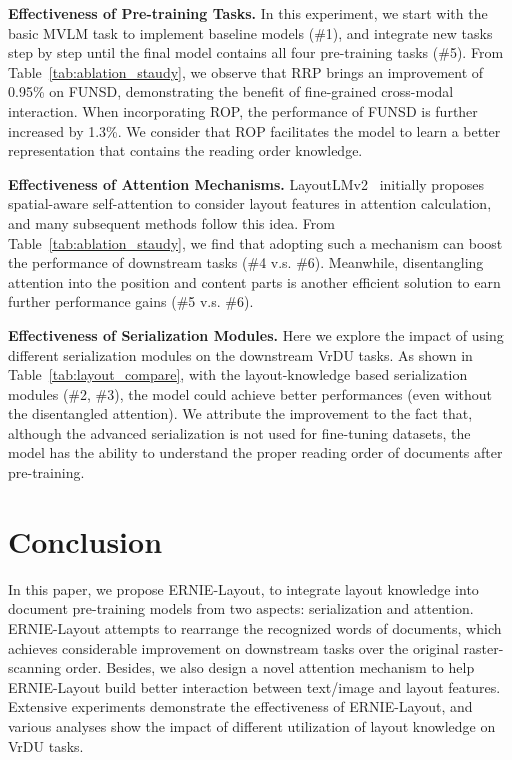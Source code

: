 \documentclass[11pt]{article}
\begin{document}
\noindent\textbf{Effectiveness of Pre-training Tasks.} 
In this experiment, we start with the basic MVLM task to implement baseline models (\#1), and integrate new tasks step by step until the final model contains all four pre-training tasks (\#5).
From Table~\ref{tab:ablation_staudy}, we observe that RRP brings an improvement of 0.95\% on FUNSD, demonstrating the benefit of fine-grained cross-modal interaction.
When incorporating ROP, the performance of FUNSD is further increased by 1.3\%. We consider that ROP facilitates the model to learn a better representation that contains the reading order knowledge. 


\noindent\textbf{Effectiveness of Attention Mechanisms.} 
LayoutLMv2~\cite{xu2021layoutlmv2} initially proposes spatial-aware self-attention to consider layout features in attention calculation, and many subsequent methods follow this idea.
From Table~\ref{tab:ablation_staudy}, we find that adopting such a mechanism can boost the performance of downstream tasks (\#4 v.s. \#6).
Meanwhile, disentangling attention into the position and content parts is another efficient solution to earn further performance gains (\#5 v.s. \#6).



\noindent\textbf{Effectiveness of Serialization Modules.}
Here we explore the impact of using different serialization modules on the downstream VrDU tasks.
As shown in Table~\ref{tab:layout_compare}, with the layout-knowledge based serialization modules (\#2, \#3), the model could achieve better performances (even without the disentangled attention).
We attribute the improvement to the fact that, although the advanced serialization is not used for fine-tuning datasets, the model has the ability to understand the proper reading order of documents after pre-training.

\section{Conclusion}

In this paper, we propose ERNIE-Layout, to integrate layout knowledge into document pre-training models from two aspects: serialization and attention.
ERNIE-Layout attempts to rearrange the recognized words of documents, which achieves considerable improvement on downstream tasks over the original raster-scanning order.
Besides, we also design a novel attention mechanism to help ERNIE-Layout build better interaction between text/image and layout features.
Extensive experiments demonstrate the effectiveness of ERNIE-Layout, and various analyses show the impact of different utilization of layout knowledge on VrDU tasks.
\end{document}
